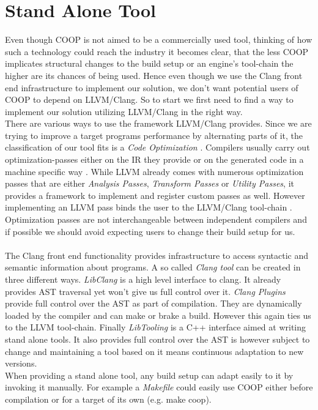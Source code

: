 \section{Stand Alone Tool}\label{stand_alone_tool}
Even though COOP is not aimed to be a commercially used tool, thinking of how such a technology could reach the industry it becomes clear, that the less COOP implicates structural changes to the build setup or an engine's tool-chain the higher are its chances of being used. Hence even though we use the Clang front end infrastructure to implement our solution, we don't want potential users of COOP to depend on LLVM/Clang. So to start we first need to find a way to implement our solution utilizing LLVM/Clang in the right way.\\ 
There are various ways to use the framework LLVM/Clang provides. Since we are trying to improve a target programs performance by alternating parts of it, the classification of our tool fits is a \textit{Code Optimization} . Compilers usually carry out optimization-passes either on the IR they provide or on the generated code in a machine specific way . While LLVM already comes with numerous optimization passes that are either \textit{Analysis Passes}, \textit{Transform Passes} or \textit{Utility Passes}, it provides a framework to implement and register custom passes as well. However implementing an LLVM pass binds the user to the LLVM/Clang tool-chain . Optimization passes are not interchangeable between independent compilers and if possible we should avoid expecting users to change their build setup for us.\\\\
The Clang front end functionality provides infrastructure to access syntactic and semantic information about programs. A so called \textit{Clang tool} can be created in three different ways.
\textit{LibClang} is a high level interface to clang. It already provides AST traversal yet won't give us full control over it. \textit{Clang Plugins} provide full control over the AST as part of compilation. They are dynamically loaded by the compiler and can make or brake a build. However this again ties us to the LLVM tool-chain. Finally \textit{LibTooling} is a C++ interface aimed at writing stand alone tools. It also provides full control over the AST is however subject to change and maintaining a tool based on it means continuous adaptation to new versions. \\
When providing a stand alone tool, any build setup can adapt easily to it by invoking it manually. For example a \textit{Makefile} could easily use COOP either before compilation or for a target of its own (e.g. make coop).\\
